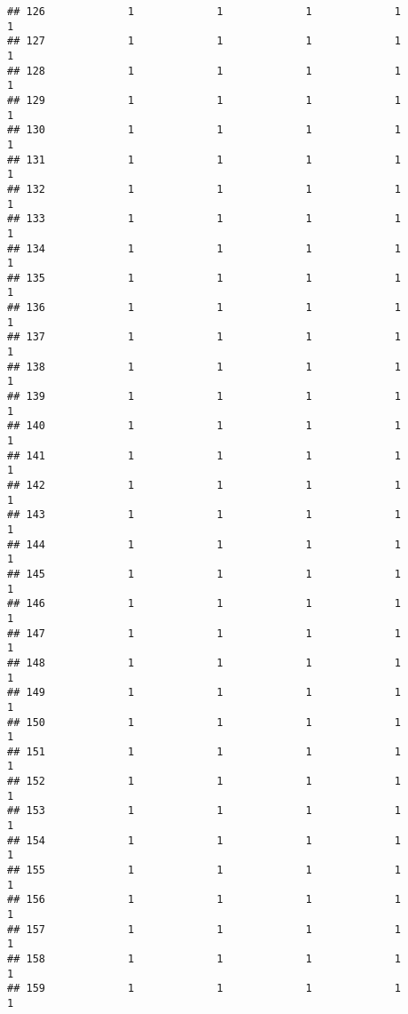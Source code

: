 \documentclass[
]{article}
\begin{document}
\begin{verbatim}
## 126             1             1             1             1             1
## 127             1             1             1             1             1
## 128             1             1             1             1             1
## 129             1             1             1             1             1
## 130             1             1             1             1             1
## 131             1             1             1             1             1
## 132             1             1             1             1             1
## 133             1             1             1             1             1
## 134             1             1             1             1             1
## 135             1             1             1             1             1
## 136             1             1             1             1             1
## 137             1             1             1             1             1
## 138             1             1             1             1             1
## 139             1             1             1             1             1
## 140             1             1             1             1             1
## 141             1             1             1             1             1
## 142             1             1             1             1             1
## 143             1             1             1             1             1
## 144             1             1             1             1             1
## 145             1             1             1             1             1
## 146             1             1             1             1             1
## 147             1             1             1             1             1
## 148             1             1             1             1             1
## 149             1             1             1             1             1
## 150             1             1             1             1             1
## 151             1             1             1             1             1
## 152             1             1             1             1             1
## 153             1             1             1             1             1
## 154             1             1             1             1             1
## 155             1             1             1             1             1
## 156             1             1             1             1             1
## 157             1             1             1             1             1
## 158             1             1             1             1             1
## 159             1             1             1             1             1

\end{verbatim}
\end{document}

